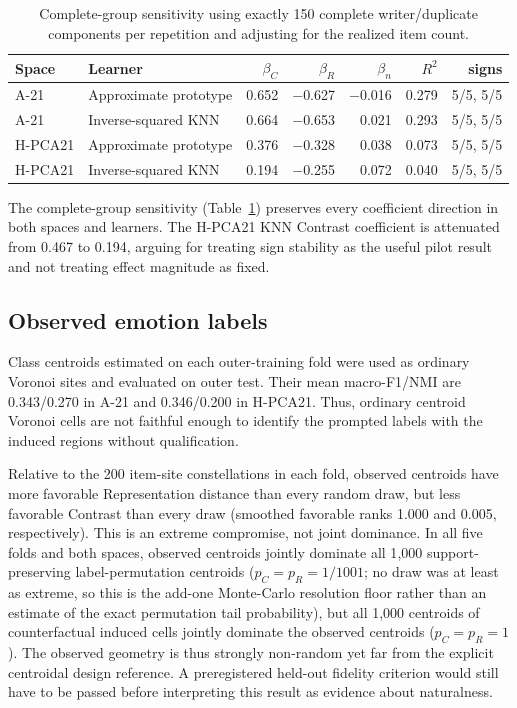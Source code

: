 \documentclass[11pt]{article}
\begin{document}
\begin{table}[ht]
\centering\footnotesize
\caption{Complete-group sensitivity using exactly 150 complete writer/duplicate components per repetition and adjusting for the realized item count.}
\label{tab:cr-sensitivity}
\begin{tabular}{llrrrrr}
\toprule
Space & Learner & $\beta_C$ & $\beta_R$ & $\beta_n$ & $R^2$ & signs\\
\midrule
A-21 & Approximate prototype & 0.652 & $-$0.627 & $-$0.016 & 0.279 & 5/5, 5/5\\
A-21 & Inverse-squared KNN    & 0.664 & $-$0.653 &  0.021 & 0.293 & 5/5, 5/5\\
H-PCA21 & Approximate prototype & 0.376 & $-$0.328 & 0.038 & 0.073 & 5/5, 5/5\\
H-PCA21 & Inverse-squared KNN    & 0.194 & $-$0.255 & 0.072 & 0.040 & 5/5, 5/5\\
\bottomrule
\end{tabular}
\end{table}

The complete-group sensitivity (Table~\ref{tab:cr-sensitivity}) preserves every coefficient direction in both spaces and learners. The H-PCA21 KNN Contrast coefficient is attenuated from 0.467 to 0.194, arguing for treating sign stability as the useful pilot result and not treating effect magnitude as fixed.

\subsection{Observed emotion labels}

Class centroids estimated on each outer-training fold were used as ordinary Voronoi sites and evaluated on outer test. Their mean macro-F1/NMI are 0.343/0.270 in A-21 and 0.346/0.200 in H-PCA21. Thus, ordinary centroid Voronoi cells are not faithful enough to identify the prompted labels with the induced regions without qualification.

Relative to the 200 item-site constellations in each fold, observed centroids have more favorable Representation distance than every random draw, but less favorable Contrast than every draw (smoothed favorable ranks 1.000 and 0.005, respectively). This is an extreme compromise, not joint dominance. In all five folds and both spaces, observed centroids jointly dominate all 1{,}000 support-preserving label-permutation centroids ($p_C=p_R=1/1001$; no draw was at least as extreme, so this is the add-one Monte-Carlo resolution floor rather than an estimate of the exact permutation tail probability), but all 1{,}000 centroids of counterfactual induced cells jointly dominate the observed centroids ($p_C=p_R=1$). The observed geometry is thus strongly non-random yet far from the explicit centroidal design reference. A preregistered held-out fidelity criterion would still have to be passed before interpreting this result as evidence about naturalness.
\end{document}
